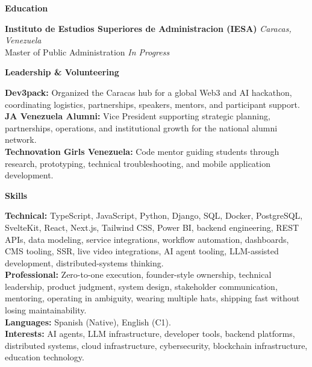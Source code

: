 \documentclass[11pt]{article}
\begin{document}
\vspace{8pt}
\begin{center}
    \textbf{Education}
\end{center}
\vspace{-4pt}
\textbf{Instituto de Estudios Superiores de Administracion (IESA)} \hfill \textit{Caracas, Venezuela} \\
Master of Public Administration \hfill \textit{In Progress}

\vspace{8pt}
\begin{center}
    \textbf{Leadership \& Volunteering}
\end{center}
\vspace{-4pt}
\textbf{Dev3pack:} Organized the Caracas hub for a global Web3 and AI hackathon, coordinating logistics, partnerships, speakers, mentors, and participant support. \\
\textbf{JA Venezuela Alumni:} Vice President supporting strategic planning, partnerships, operations, and institutional growth for the national alumni network. \\
\textbf{Technovation Girls Venezuela:} Code mentor guiding students through research, prototyping, technical troubleshooting, and mobile application development.

\vspace{8pt}
\begin{center}
    \textbf{Skills}
\end{center}
\vspace{-4pt}
\textbf{Technical:} TypeScript, JavaScript, Python, Django, SQL, Docker, PostgreSQL, SvelteKit, React, Next.js, Tailwind CSS, Power BI, backend engineering, REST APIs, data modeling, service integrations, workflow automation, dashboards, CMS tooling, SSR, live video integrations, AI agent tooling, LLM-assisted development, distributed-systems thinking.
\\[4pt]
\textbf{Professional:} Zero-to-one execution, founder-style ownership, technical leadership, product judgment, system design, stakeholder communication, mentoring, operating in ambiguity, wearing multiple hats, shipping fast without losing maintainability. \\[4pt]
\textbf{Languages:} Spanish (Native), English (C1). \\[4pt]
\textbf{Interests:} AI agents, LLM infrastructure, developer tools, backend platforms, distributed systems, cloud infrastructure, cybersecurity, blockchain infrastructure, education technology.
\end{document}
